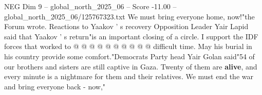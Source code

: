 \begin{textsample}{NEG Dim 9 – global\_north\_2025\_06 – Score -11.00 – global\_north\_2025\_06/125767323.txt}
We must bring everyone home, now!"the Forum wrote.
Reactions to Yaakov ' s recovery Opposition Leader Yair Lapid said that Yaakov ' s return"is an important closing of a circle.
I support the IDF forces that worked to @ @ @ @ @ @ @ @ @ @ difficult time.
May his burial in his country provide some comfort."Democrats Party head Yair Golan said"54 of our brothers and sisters are still captive in Gaza.
Twenty of them are \textbf{alive}, and every minute is a nightmare for them and their relatives.
We must end the war and bring everyone back - now,"

\end{textsample}
